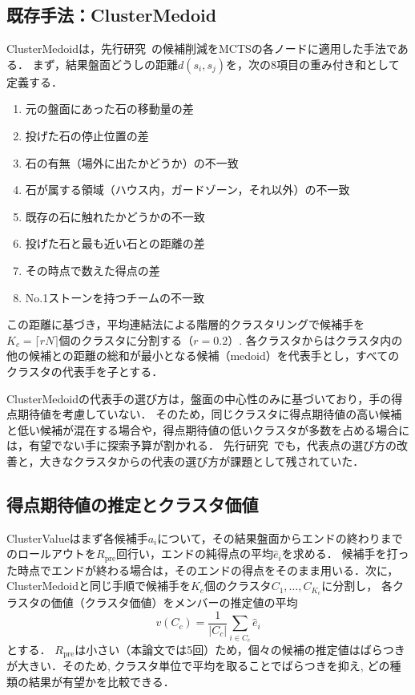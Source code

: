 \documentclass[submit]{ipsj}
\begin{document}
\subsection{既存手法：ClusterMedoid}
\label{sec:method-medoid}

ClusterMedoidは，先行研究~\cite{naka_gi58}の候補削減をMCTSの各ノードに適用した手法である．
まず，結果盤面どうしの距離$d(s_i, s_j)$を，次の8項目の重み付き和として定義する．
\begin{enumerate}
\setlength{\itemsep}{0pt}
\item 元の盤面にあった石の移動量の差
\item 投げた石の停止位置の差
\item 石の有無（場外に出たかどうか）の不一致
\item 石が属する領域（ハウス内，ガードゾーン，それ以外）の不一致
\item 既存の石に触れたかどうかの不一致
\item 投げた石と最も近い石との距離の差
\item その時点で数えた得点の差
\item No.1ストーンを持つチームの不一致
\end{enumerate}
この距離に基づき，平均連結法による階層的クラスタリングで候補手を$K_c = \lceil rN \rceil$個のクラスタに分割する（$r=0.2$）.
各クラスタからはクラスタ内の他の候補との距離の総和が最小となる候補（medoid）を代表手とし，すべてのクラスタの代表手を子とする．

ClusterMedoidの代表手の選び方は，盤面の中心性のみに基づいており，手の得点期待値を考慮していない．
そのため，同じクラスタに得点期待値の高い候補と低い候補が混在する場合や，得点期待値の低いクラスタが多数を占める場合には，有望でない手に探索予算が割かれる．
先行研究~\cite{naka_gi58}でも，代表点の選び方の改善と，大きなクラスタからの代表の選び方が課題として残されていた．

\subsection{得点期待値の推定とクラスタ価値}
\label{sec:method-estimate}
ClusterValueはまず各候補手$a_i$について，その結果盤面からエンドの終わりまでのロールアウトを$R_{\mathrm{pre}}$回行い，エンドの純得点の平均$\hat{e}_i$を求める．
候補手を打った時点でエンドが終わる場合は，そのエンドの得点をそのまま用いる．次に，ClusterMedoidと同じ手順で候補手を$K_c$個のクラスタ$C_1,\dots,C_{K_c}$に分割し，
各クラスタの価値（クラスタ価値）をメンバーの推定値の平均
\begin{equation}
v(C_c) = \frac{1}{|C_c|}\sum_{i \in C_c} \hat{e}_i
\label{eq:cluster-value}
\end{equation}
とする．
$R_{\mathrm{pre}}$は小さい（本論文では5回）ため，個々の候補の推定値はばらつきが大きい．そのため, クラスタ単位で平均を取ることでばらつきを抑え, どの種類の結果が有望かを比較できる．
\end{document}

